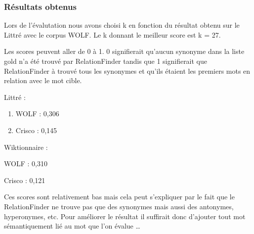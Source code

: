 \subsubsection{Résultats obtenus}

Lors de l'évalutation nous avons choisi k en fonction du résultat obtenu sur 
le Littré avec le corpus WOLF. Le k donnant le meilleur score est k = 27.

Les scores peuvent aller de 0 à 1. 0 signifierait qu'aucun synonyme dans la 
liste gold n'a été trouvé par RelationFinder tandis que 1 signifierait que 
RelationFinder à trouvé tous les synonymes et qu'ils étaient les premiers mots 
en relation avec le mot cible.

\begin{enumerate}
 \item {Littré :
	\begin{enumerate}
	 \item WOLF :  0,306
	 \item Crisco : 0,145
	\end{enumerate}
	}
 \item {Wiktionnaire :
	\item WOLF : 0,310
	\item Crisco : 0,121
	}
\end{enumerate}

Ces scores sont relativement bas mais cela peut s'expliquer par le fait que le 
RelationFinder ne trouve pas que des synonymes mais aussi des antonymes, 
hyperonymes, etc. Pour améliorer le résultat il suffirait donc d'ajouter 
tout mot sémantiquement lié au mot que l'on évalue \dots 

